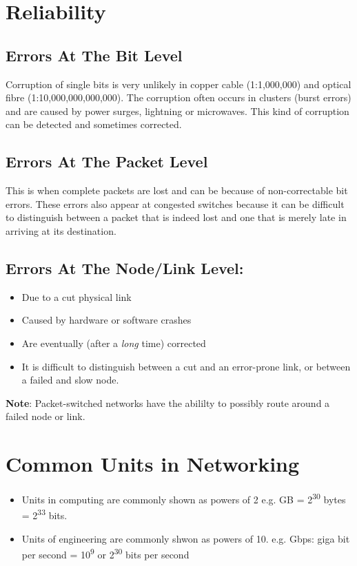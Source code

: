 \documentclass[11pt]{article}
\begin{document}
\section{Reliability}
\label{sec:orgbeeb098}
\subsection{Errors At The Bit Level}
\label{sec:orgbd5cb0c}
Corruption of single bits is very unlikely in copper cable (1:1,000,000) and optical fibre (1:10,000,000,000,000).
The corruption often occurs in clusters (burst errors) and are caused by power surges, lightning or microwaves.
This kind of corruption can be detected and sometimes corrected.

\subsection{Errors At The Packet Level}
\label{sec:orgffac70e}
This is when complete packets are lost and can be because of non-correctable bit errors.
These errors also appear at congested switches because it can be difficult to distinguish between a packet that is indeed lost and one that is merely late in arriving at its destination.

\subsection{Errors At The Node/Link Level:}
\label{sec:org9803586}
\begin{itemize}
\item Due to a cut physical link
\item Caused by hardware or software crashes
\item Are eventually (after a \emph{long} time) corrected
\item It is difficult to distinguish between a cut and an error-prone link, or between a failed and slow node.
\end{itemize}
\textbf{Note}: Packet-switched networks have the abililty to possibly route around a failed node or link.

\section{Common Units in Networking}
\label{sec:orgdb20f1d}
\begin{itemize}
\item Units in computing are commonly shown as powers of 2 e.g. GB = 2\textsuperscript{30} bytes = 2\textsuperscript{33} bits.
\item Units of engineering are commonly shwon as powers of 10. e.g. Gbps: giga bit per second = 10\textsuperscript{9} or 2\textsuperscript{30} bits per second
\end{itemize}
\end{document}
